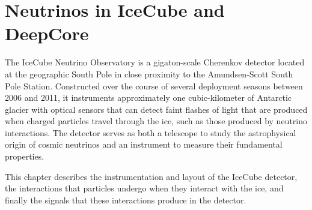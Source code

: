 \setchapterpreamble[u]{\margintoc}
\chapter{Neutrinos in IceCube and DeepCore}

The IceCube Neutrino Observatory is a gigaton-scale Cherenkov detector located at the geographic South Pole in close proximity to the Amundsen-Scott South Pole Station.
Constructed over the course of several deployment seasons between 2006 and 2011, it instruments approximately one cubic-kilometer of Antarctic glacier with optical sensors that can detect faint flashes of light that are produced when charged particles travel through the ice, such as those produced by neutrino interactions.
The detector serves as both a telescope to study the astrophysical origin of cosmic neutrinos and an instrument to measure their fundamental properties.

This chapter describes the instrumentation and layout of the IceCube detector, the interactions that particles undergo when they interact with the ice, and finally the signals that these interactions produce in the detector.







% 
% 
